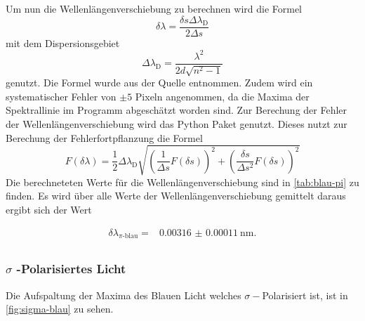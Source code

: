 Um nun die Wellenlängenverschiebung zu berechnen wird die Formel
\begin{equation}
    \delta \lambda = \frac{\delta s \Delta \lambda _\text{D}}{2\Delta s}
   \label{eq:Wellenlaengenverschiebung}
\end{equation}
mit dem Dispersionsgebiet
\begin{equation*}
    \Delta \lambda _\text{D} = \frac{\lambda^2}{2d\sqrt{n^2-1}}
\end{equation*}
genutzt. 
\FloatBarrier
Die Formel wurde aus der Quelle \cite[4]{anleitung} entnommen.
Zudem wird ein systematischer Fehler von $\pm 5$ Pixeln angenommen, da die Maxima der Spektrallinie im Programm \cite{paint3d} abgeschätzt worden sind.
Zur Berechung der Fehler der Wellenlängenverschiebung wird das Python Paket \cite{uncertainties} genutzt.
Dieses nutzt zur Berechung der Fehlerfortpflanzung die Formel
\begin{equation}
    F(\delta \lambda) = \frac{1}{2} \Delta \lambda _\text{D} \sqrt{\left (\frac{1}{\Delta s} F(\delta s) \right)^2 + \left ( \frac{\delta s}{\Delta s^2} F(\delta s) \right )^2}
    \label{eq:fehler_Wellenlaengenverschiebung}
\end{equation}
Die berechneteten Werte für die Wellenlängenverschiebung sind in \autoref{tab:blau-pi} zu finden.
Es wird über alle Werte der Wellenlängenverschiebung gemittelt daraus ergibt sich der Wert

\begin{align*}
    \delta \lambda _\text{$\pi$-blau} = & \SI{0.00316(011)}{\nano\meter}. \\
\end{align*}

\subsubsection{\boldmath\texorpdfstring{$\sigma$}{sigma} -Polarisiertes Licht}

Die Aufspaltung der Maxima des Blauen Licht welches $\sigma -$Polarisiert ist, ist in \autoref{fig:sigma-blau} zu sehen.

